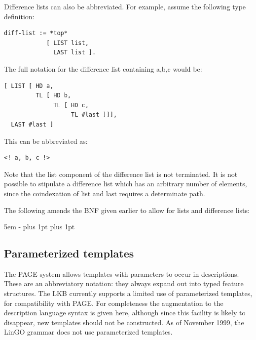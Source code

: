 \documentclass[12pt]{report}
\begin{document}
Difference lists can also be abbreviated.  For example,
assume the following type definition:
\begin{verbatim}
diff-list := *top*
            [ LIST list,
              LAST list ].
\end{verbatim}
The full notation for the difference list containing a,b,c would be:
\begin{verbatim}
[ LIST [ HD a,
         TL [ HD b,
              TL [ HD c,
                   TL #last ]]],
  LAST #last ]
\end{verbatim}
This can be abbreviated as:
\begin{verbatim}
<! a, b, c !>
\end{verbatim}
Note that the list component of the difference list is not terminated.
It is not possible to stipulate a difference list which has an arbitrary
number of elements, since the coindexation of {\feature list}
and {\feature last} requires a determinate
path.

The following amends the BNF given earlier to allow for lists and difference
lists:
\begin{list}{}
   {\leftmargin 5em
    \itemindent -\leftmargin
    \itemsep 0pt plus 1pt
    \parsep 0pt plus 1pt}
%
%
%
\end{list}

\subsection{Parameterized templates}
\label{templatedesc}

The PAGE system allows templates with parameters to occur in descriptions.
These are an abbreviatory notation: they always expand out into 
typed feature structures.
The LKB currently supports a limited use of parameterized
templates, for compatibility with PAGE.
For completeness the augmentation to the description language
syntax is given here, although since this facility is likely
to disappear, new templates should not be constructed.
As of November 1999, the LinGO grammar does not use parameterized templates.
\end{document}
